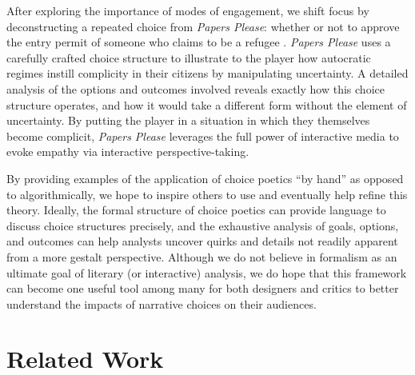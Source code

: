 \documentclass[arts,article,submit,moreauthors,pdftex,10pt,a4paper]{Definitions/mdpi}
\begin{document}
After exploring the importance of modes of engagement, we shift focus by deconstructing a repeated choice from \emph{Papers Please}: whether or not to approve the entry permit of someone who claims to be a refugee \citep{pope2013papers}.
%
\emph{Papers Please} uses a carefully crafted choice structure to illustrate to the player how autocratic regimes instill complicity in their citizens by manipulating uncertainty.
%
A detailed analysis of the options and outcomes involved reveals exactly how this choice structure operates, and how it would take a different form without the element of uncertainty.
%
By putting the player in a situation in which they themselves become complicit, \emph{Papers Please} leverages the full power of interactive media to evoke empathy via interactive perspective-taking.


By providing examples of the application of choice poetics ``by hand'' as opposed to algorithmically, we hope to inspire others to use and eventually help refine this theory.
%
Ideally, the formal structure of choice poetics can provide language to discuss choice structures precisely, and the exhaustive analysis of goals, options, and outcomes can help analysts uncover quirks and details not readily apparent from a more gestalt perspective.
%
Although we do not believe in formalism as an ultimate goal of literary (or interactive) analysis, we do hope that this framework can become one useful tool among many for both designers and critics to better understand the impacts of narrative choices on their audiences.

\section{Related Work}
\end{document}
